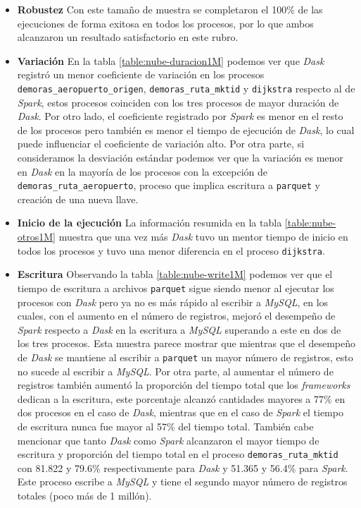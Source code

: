 \begin{itemize}
	\item \textbf{Robustez} Con este tamaño de muestra se completaron el 100\% de las ejecuciones de forma exitosa en todos los procesos, por lo que ambos alcanzaron un resultado satisfactorio en este rubro.

	\item \textbf{Variación} En la tabla \ref{table:nube-duracion1M} podemos ver que \textit{Dask} registró un menor coeficiente de variación en los procesos \texttt{demoras\_aeropuerto\_origen}, \texttt{demoras\_ruta\_mktid} y \texttt{dijkstra} respecto al de \textit{Spark}, estos procesos coinciden con los tres procesos de mayor duración de \textit{Dask}. Por otro lado, el coeficiente registrado por \textit{Spark} es menor en el resto de los procesos pero también es menor el tiempo de ejecución de \textit{Dask}, lo cual puede influenciar el coeficiente de variación alto. Por otra parte, si consideramos la desviación estándar podemos ver que la variación es menor en \textit{Dask} en la mayoría de los procesos con la excepción de \texttt{demoras\_ruta\_aeropuerto}, proceso que implica escritura a \texttt{parquet} y creación de una nueva llave.
	
	\item \textbf{Inicio de la ejecución} La información resumida en la tabla \ref{table:nube-otros1M} muestra que una vez más \textit{Dask} tuvo un mentor tiempo de inicio en todos los procesos y tuvo una menor diferencia en el proceso \texttt{dijkstra}.
	
	\item \textbf{Escritura} Observando la tabla \ref{table:nube-write1M} podemos ver que el tiempo de escritura a archivos \texttt{parquet} sigue siendo menor al ejecutar los procesos con \textit{Dask} pero ya no es más rápido al escribir a \textit{MySQL}, en los cuales, con el aumento en el número de registros, mejoró el desempeño de \textit{Spark} respecto a \textit{Dask} en la escritura a \textit{MySQL} superando a este en dos de los tres procesos. Esta muestra parece mostrar que mientras que el desempeño de \textit{Dask} se mantiene al escribir a \texttt{parquet} un mayor número de registros, esto no sucede al escribir a \textit{MySQL}. Por otra parte, al aumentar el número de registros también aumentó la proporción del tiempo total que los \textit{frameworks} dedican a la escritura, este porcentaje alcanzó cantidades mayores a 77\% en dos procesos en el caso de \textit{Dask}, mientras que en el caso de \textit{Spark} el tiempo de escritura nunca fue mayor al 57\% del tiempo total. También cabe mencionar que tanto \textit{Dask} como \textit{Spark} alcanzaron el mayor tiempo de escritura y proporción del tiempo total en el proceso \texttt{demoras\_ruta\_mktid} con 81.822 y 79.6\% respectivamente para \textit{Dask} y 51.365 y 56.4\% para \textit{Spark}. Este proceso escribe a \textit{MySQL} y tiene el segundo mayor número de registros totales (poco más de 1 millón).
	

\end{itemize}
